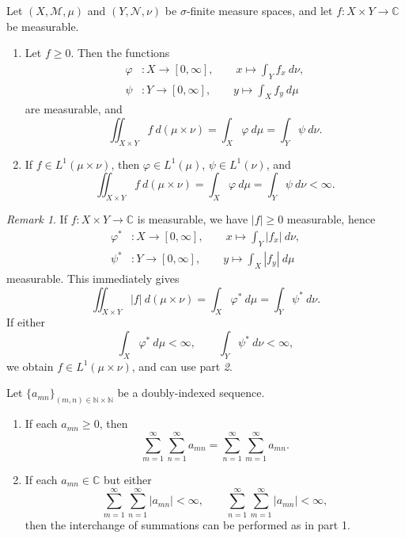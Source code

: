 \documentclass[11pt]{article}
\newcommand{\C}{\mathbb{C}}
\newcommand{\N}{\mathbb{N}}
\newcommand{\M}{\mathcal{M}}
\newcommand{\MN}{\mathcal{N}}
\theoremstyle{definition}
\theoremstyle{remark}
\newtheorem*{remark}{Remark}
\numberwithin{equation}{section}
\begin{document}
    \begin{theorem}
        Let $(X, \M, \mu)$ and $(Y, \MN, \nu)$ be $\sigma$-finite measure spaces, and
        let $f\colon X\times Y \to \C$ be measurable.
        \begin{enumerate}
            \item Let $f\geq 0$. Then the functions \begin{align*}
                \varphi&\colon X \to [0, \infty], \qquad x \mapsto \int_Y f_x\:d\nu,
                \\
                \psi&\colon Y \to [0, \infty], \qquad y \mapsto \int_X f_y\:d\mu
            \end{align*}
            are measurable, and \[
                \iint_{X\times Y} f\:d(\mu\times \nu) = \int_X \varphi\:d\mu = \int_Y
                \psi\:d\nu.
            \] 

            \item If $f \in L^1(\mu\times \nu)$, then $\varphi \in L^1(\mu)$, $\psi
            \in L^1(\nu)$, and \[
                \iint_{X\times Y} f\:d(\mu\times \nu) = \int_X \varphi\:d\mu = \int_Y
                \psi\:d\nu < \infty.
            \] 
        \end{enumerate}

        \begin{remark}
            If $f\colon X \times Y \to \C$ is measurable, we have $|f| \geq 0$
            measurable, hence \begin{align*}
                \varphi^*&\colon X \to [0, \infty], \qquad x \mapsto \int_Y |f_x|\:d\nu,
                \\
                \psi^*&\colon Y \to [0, \infty], \qquad y \mapsto \int_X |f_y|\:d\mu
            \end{align*}
            measurable. This immediately gives \[
                \iint_{X \times Y} |f|\:d(\mu\times\nu) = \int_X \varphi^*\:d\mu =
                \int_Y \psi^*\:d\nu.
            \] If either \[
                \int_X \varphi^*\:d\mu < \infty, \qquad
                \int_Y \psi^*\:d\nu < \infty,
            \] we obtain $f \in L^1(\mu\times\nu)$, and can use part \emph{2}.
        \end{remark}
    \end{theorem}

    \begin{corollary}
        Let $\{a_{mn}\}_{(m, n) \in \N\times\N}$ be a doubly-indexed sequence.
        \begin{enumerate}
            \item If each $a_{mn} \geq 0$, then \[
                 \sum_{m = 1}^\infty \sum_{n = 1}^\infty a_{mn} = \sum_{n = 1}^\infty
                 \sum_{m = 1}^\infty a_{mn}.
            \]
            \item If each $a_{mn} \in \C$ but either \[
                \sum_{m = 1}^\infty \sum_{n = 1}^\infty |a_{mn}| < \infty, \qquad
                \sum_{n = 1}^\infty \sum_{m = 1}^\infty |a_{mn}| < \infty,
            \] then the interchange of summations can be performed as in part 1.
        \end{enumerate}
    \end{corollary}
\end{document}
